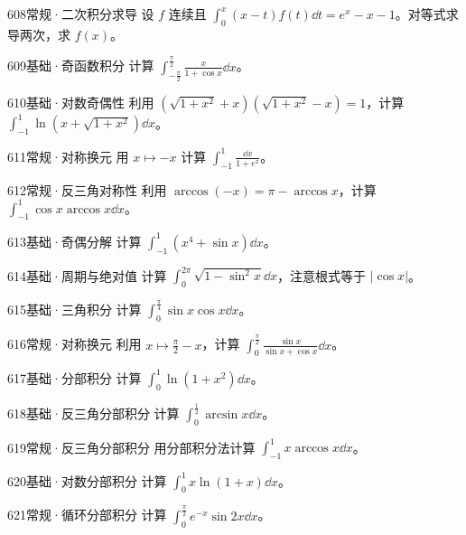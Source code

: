 \begin{exercise}{608}{常规·二次积分求导}
设 $f$ 连续且 $\int_0^x(x-t)f(t)\dd t=e^x-x-1$。对等式求导两次，求 $f(x)$。
\end{exercise}
\begin{exercise}{609}{基础·奇函数积分}
计算 $\int_{-\frac{\pi}{2}}^{\frac{\pi}{2}}\frac{x}{1+\cos x}\dd x$。
\end{exercise}
\begin{exercise}{610}{基础·对数奇偶性}
利用 $(\sqrt{1+x^2}+x)(\sqrt{1+x^2}-x)=1$，计算 $\int_{-1}^1\ln(x+\sqrt{1+x^2})\dd x$。
\end{exercise}
\begin{exercise}{611}{常规·对称换元}
用 $x\mapsto-x$ 计算 $\int_{-1}^1\frac{\dd x}{1+e^x}$。
\end{exercise}
\begin{exercise}{612}{常规·反三角对称性}
利用 $\arccos(-x)=\pi-\arccos x$，计算 $\int_{-1}^1\cos x\arccos x\dd x$。
\end{exercise}
\begin{exercise}{613}{基础·奇偶分解}
计算 $\int_{-1}^1(x^4+\sin x)\dd x$。
\end{exercise}
\begin{exercise}{614}{基础·周期与绝对值}
计算 $\int_0^{2\pi}\sqrt{1-\sin^2x}\dd x$，注意根式等于 $|\cos x|$。
\end{exercise}
\begin{exercise}{615}{基础·三角积分}
计算 $\int_0^{\frac{\pi}{4}}\sin x\cos x\dd x$。
\end{exercise}
\begin{exercise}{616}{常规·对称换元}
利用 $x\mapsto\frac{\pi}{2}-x$，计算 $\int_0^{\frac{\pi}{2}}\frac{\sin x}{\sin x+\cos x}\dd x$。
\end{exercise}
\begin{exercise}{617}{基础·分部积分}
计算 $\int_0^1\ln(1+x^2)\dd x$。
\end{exercise}
\begin{exercise}{618}{基础·反三角分部积分}
计算 $\int_0^{\frac{1}{2}}\arcsin x\dd x$。
\end{exercise}
\begin{exercise}{619}{常规·反三角分部积分}
用分部积分法计算 $\int_{-1}^1x\arccos x\dd x$。
\end{exercise}
\begin{exercise}{620}{基础·对数分部积分}
计算 $\int_0^1x\ln(1+x)\dd x$。
\end{exercise}
\begin{exercise}{621}{常规·循环分部积分}
计算 $\int_0^{\frac{\pi}{2}}e^{-x}\sin2x\dd x$。
\end{exercise}
